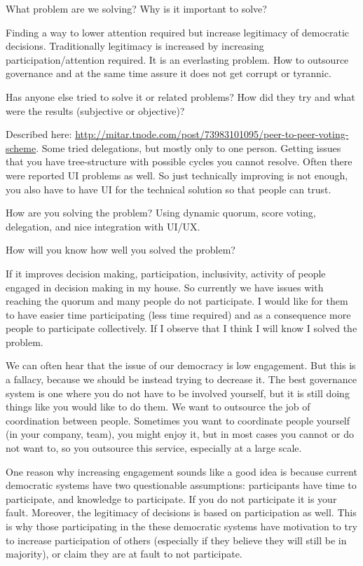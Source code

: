\documentclass{sigchi}
\begin{document}
What problem are we solving? Why is it important to solve?

Finding a way to lower attention required but increase legitimacy of democratic decisions.
Traditionally legitimacy is increased by increasing participation/attention required.
It is an everlasting problem.
How to outsource governance and at the same time assure it does not get corrupt
or tyrannic.

Has anyone else tried to solve it or related problems? How did they try
and what were the results (subjective or objective)?

Described here: \url{http://mitar.tnode.com/post/73983101095/peer-to-peer-voting-scheme}.
Some tried delegations, but mostly only to one person.
Getting issues that you have tree-structure with possible cycles you cannot resolve.
Often there were reported UI problems as well.
So just technically improving is not enough, you also have to have UI for the technical solution so that people can trust.


How are you solving the problem?
Using dynamic quorum, score voting, delegation, and nice integration with UI/UX.

How will you know how well you solved the problem?

If it improves decision making, participation, inclusivity, activity of people engaged in decision making in my house.
So currently we have issues with reaching the quorum and many people do not participate.
I would like for them to have easier time participating (less time required) and as a consequence more people to
participate collectively.
If I observe that I think I will know I solved the problem.


We can often hear that the issue of our democracy is low engagement.
But this is a fallacy, because we should be instead trying to decrease it.
The best governance system is one where you do not have to be involved yourself, but it is still doing things
like you would like to do them.
We want to outsource the job of coordination between people.
Sometimes you want to coordinate people yourself (in your company, team), you might enjoy it, but in most cases
you cannot or do not want to, so you outsource this service, especially at a large scale.

One reason why increasing engagement sounds like a good idea is because current democratic systems have two
questionable assumptions: participants have time to participate, and knowledge to participate.
If you do not participate it is your fault.
Moreover, the legitimacy of decisions is based on participation as well.
This is why those participating in the these democratic systems have motivation to try to increase participation
of others (especially if they believe they will still be in majority), or claim they are at fault to not participate.
\end{document}
